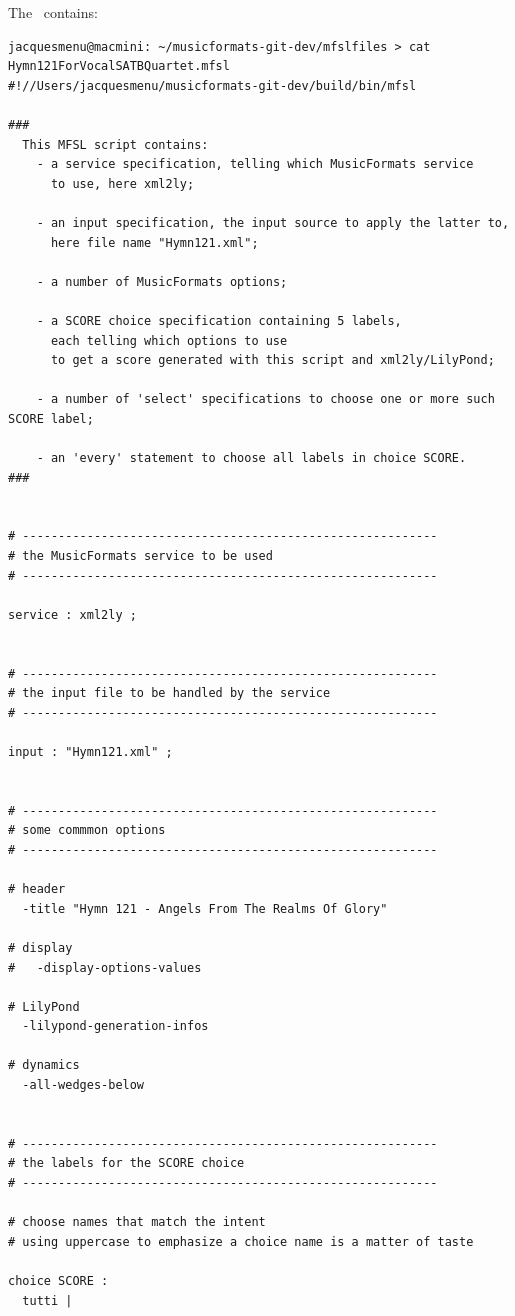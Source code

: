The  \script\ contains:
\begin{lstlisting}[language=MFSL]
jacquesmenu@macmini: ~/musicformats-git-dev/mfslfiles > cat Hymn121ForVocalSATBQuartet.mfsl
#!//Users/jacquesmenu/musicformats-git-dev/build/bin/mfsl

###
  This MFSL script contains:
    - a service specification, telling which MusicFormats service
      to use, here xml2ly;

    - an input specification, the input source to apply the latter to,
      here file name "Hymn121.xml";

    - a number of MusicFormats options;

    - a SCORE choice specification containing 5 labels,
      each telling which options to use
      to get a score generated with this script and xml2ly/LilyPond;

    - a number of 'select' specifications to choose one or more such SCORE label;

    - an 'every' statement to choose all labels in choice SCORE.
###


# ----------------------------------------------------------
# the MusicFormats service to be used
# ----------------------------------------------------------

service : xml2ly ;


# ----------------------------------------------------------
# the input file to be handled by the service
# ----------------------------------------------------------

input : "Hymn121.xml" ;


# ----------------------------------------------------------
# some commmon options
# ----------------------------------------------------------

# header
  -title "Hymn 121 - Angels From The Realms Of Glory"

# display
#   -display-options-values

# LilyPond
  -lilypond-generation-infos

# dynamics
  -all-wedges-below


# ----------------------------------------------------------
# the labels for the SCORE choice
# ----------------------------------------------------------

# choose names that match the intent
# using uppercase to emphasize a choice name is a matter of taste

choice SCORE :
  tutti |


\end{lstlisting}
